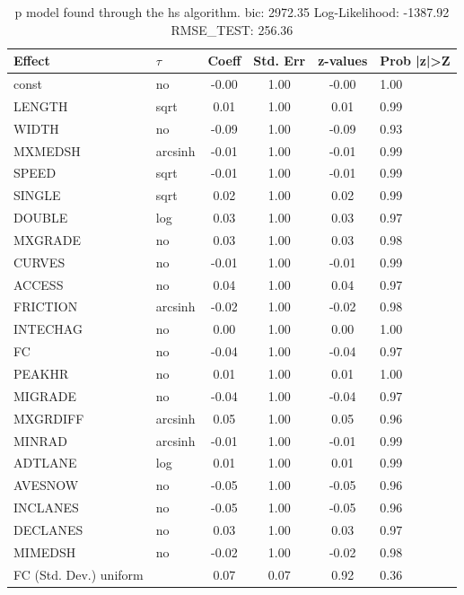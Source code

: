 \begin{table}
	\caption{p model found through the hs algorithm. bic: 2972.35 Log-Likelihood: -1387.92 RMSE_TEST: 256.36}
	\begin{center}
		\begin{tabular}{|l|l|c|c|c|l|}
			\hline
			Effect & $\tau$ & Coeff & Std. Err & z-values & Prob |z|>Z \\
			\hline
			const & no & -0.00 & 1.00 & -0.00 & 1.00 \\
			\hline
			LENGTH & sqrt & 0.01 & 1.00 & 0.01 & 0.99 \\
			\hline
			WIDTH & no & -0.09 & 1.00 & -0.09 & 0.93 \\
			\hline
			MXMEDSH & arcsinh & -0.01 & 1.00 & -0.01 & 0.99 \\
			\hline
			SPEED & sqrt & -0.01 & 1.00 & -0.01 & 0.99 \\
			\hline
			SINGLE & sqrt & 0.02 & 1.00 & 0.02 & 0.99 \\
			\hline
			DOUBLE & log & 0.03 & 1.00 & 0.03 & 0.97 \\
			\hline
			MXGRADE & no & 0.03 & 1.00 & 0.03 & 0.98 \\
			\hline
			CURVES & no & -0.01 & 1.00 & -0.01 & 0.99 \\
			\hline
			ACCESS & no & 0.04 & 1.00 & 0.04 & 0.97 \\
			\hline
			FRICTION & arcsinh & -0.02 & 1.00 & -0.02 & 0.98 \\
			\hline
			INTECHAG & no & 0.00 & 1.00 & 0.00 & 1.00 \\
			\hline
			FC & no & -0.04 & 1.00 & -0.04 & 0.97 \\
			\hline
			PEAKHR & no & 0.01 & 1.00 & 0.01 & 1.00 \\
			\hline
			MIGRADE & no & -0.04 & 1.00 & -0.04 & 0.97 \\
			\hline
			MXGRDIFF & arcsinh & 0.05 & 1.00 & 0.05 & 0.96 \\
			\hline
			MINRAD & arcsinh & -0.01 & 1.00 & -0.01 & 0.99 \\
			\hline
			ADTLANE & log & 0.01 & 1.00 & 0.01 & 0.99 \\
			\hline
			AVESNOW & no & -0.05 & 1.00 & -0.05 & 0.96 \\
			\hline
			INCLANES & no & -0.05 & 1.00 & -0.05 & 0.96 \\
			\hline
			DECLANES & no & 0.03 & 1.00 & 0.03 & 0.97 \\
			\hline
			MIMEDSH & no & -0.02 & 1.00 & -0.02 & 0.98 \\
			\hline
			FC (Std. Dev.) uniform &  & 0.07 & 0.07 & 0.92 & 0.36 \\

\end{tabular}
\end{center}
\end{table}
